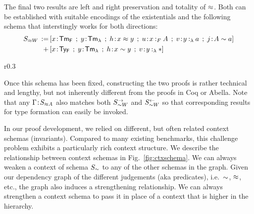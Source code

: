 The final two results are left and right preservation and totality of $\mathrel{\approx}$.
Both can be established with suitable encodings of the existentials and the following schema that interstingly works for both directions:
\begin{align*}
  S_{\tmr W} \eqdef &[x\of\TmF \mrel{;} y\of\TmL \mrel{;} h\of x \tmr y \mrel{;} u\of\typingFh{x}{A} \mrel{;} v\of\typingLh{y}{a} \mrel{;} j \of A \tyr a]\\
  \mrel{+} &[x\of\TyF \mrel{;} y\of\TmL \mrel{;} h\of x \tyr y \mrel{;} v\of\typingLh{y}{\Prp}]
\end{align*}

\begin{wrapfigure}{r}{0.3\textwidth}
  \centering
\begin{minipage}{4.5cm}
  \end{minipage}
  \caption{Dependencies between Context Schemas}
  \label{fig:ctxschema}
\end{wrapfigure}
Once this schema has been fixed, constructing the two proofs is rather technical and lengthy, but not inherently different from the proofs in Coq or Abella.
Note that any $\Gamma \!:\! S_{\mathrel{\approx} A}$ also matches both $S_{\mathrel{\sim} W}^{\rightarrow}$ and $S_{\mathrel{\sim} W}^{\leftarrow}$ so that corresponding results for type formation can easily be invoked.

In our proof development, we relied on different, but often related context schemas (invariants).
Compared to many existing benchmarks, this challenge problem exhibits a particularly rich context structure.
We describe the relationship between context schemas in Fig.~\ref{fig:ctxschema}. We can always weaken a context of schema $S_{\mathrel{\sim}}$ to any of the other schemas in the graph. Given our dependency graph of the different judgements (aka predicates), i.e.~$\mathrel{\sim}$, $\mathrel{\approx}$, etc., the graph also induces a strengthening relationship. We can always strengthen a context schema to pass it in place of a context that is higher in the hierarchy.






